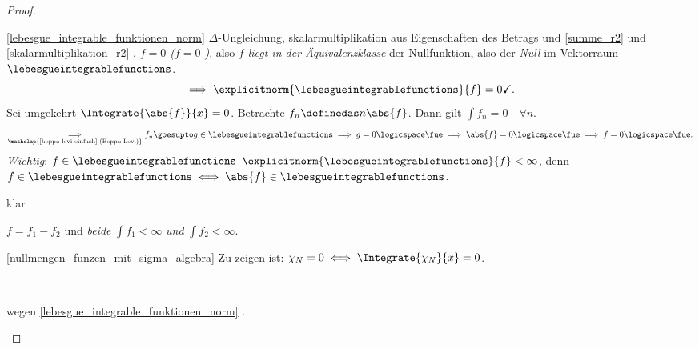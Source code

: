 \begin{proof}
  \begin{proofdescription}
    \item[\ref{lebesgue_integrable_funktionen_norm}] \( \Delta \)-Ungleichung, skalarmultiplikation aus Eigenschaften des Betrags und \ref{summe_r2} und \ref{skalarmultiplikation_r2} \checkmark. \emph{\( f=0 \) (\dh \( f=0 \) \fue)}, also \emph{\( f \) liegt in der Äquivalenzklasse} der Nullfunktion, also der \emph{Null} im Vektorraum \( \lebesgueintegrablefunctions \).
    \begin{equation*}
      \implies \explicitnorm{\lebesgueintegrablefunctions}{f}=0 \checkmark.
    \end{equation*}
    Sei umgekehrt \( \Integrate{\abs{f}}{x}=0 \). Betrachte \( f_n\definedas n\abs{f} \). Dann gilt \( \int f_n=0\quad \forall n\).
    \begin{equation*}
      \underset{\mathclap{\text{\ref{beppo-levi-einfach} (Beppo-Levi)}}}{\implies}f_n\goesupto g\in \lebesgueintegrablefunctions\implies g=0 \logicspace \text{\fue} \implies \abs{f}=0\logicspace \text{\fue}\implies f=0\logicspace \text{\fue}.
    \end{equation*}
    \emph{Wichtig}: \( f\in \lebesgueintegrablefunctions \) \timplies \( \explicitnorm{\lebesgueintegrablefunctions}{f}<\infty \), denn \( f\in \lebesgueintegrablefunctions\iff \abs{f}\in\lebesgueintegrablefunctions \). \begin{proofdescription}
      \item[\rueck] klar 
      \item[\hin] \( f=f_1-f_2 \) und \emph{beide} \( \int f_1<\infty \) \emph{und} \( \int f_2<\infty \). 
    \end{proofdescription}
    \item[\ref{nullmengen_funzen_mit_sigma_algebra}] Zu zeigen ist: \( \chi_N=0\iff \Integrate{\chi_N}{x}=0 \).
    \begin{proofdescription}
      \item[\hin] \checkmark\\
      \item[\rueck] wegen \ref{lebesgue_integrable_funktionen_norm} \checkmark. 
    \end{proofdescription}
  \end{proofdescription}
\end{proof}
